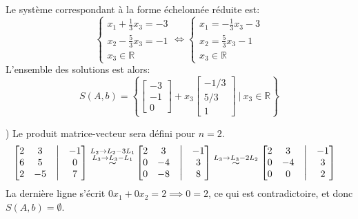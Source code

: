 \documentclass{article}
\newcommand{\R}{\mathbb{R}}
\begin{document}
Le système correspondant à la forme échelonnée réduite est:
$$\begin{cases}
x_1 + \frac{1}{3} x_3 = -3 \\
x_2 - \frac{5}{3}x_3 = -1 \\
x_3 \in \R
\end{cases} \iff 
\begin{cases}
x_1 = -\frac{1}{3} x_3 -3 \\
x_2 = \frac{5}{3}x_3 -1 \\
x_3 \in \R
\end{cases}$$
L'ensemble des solutions est alors:
$$S(A,b) = \left\{ \begin{bmatrix} -3 \\ -1 \\ 0 \end{bmatrix} + x_3 \begin{bmatrix} -1/3 \\ 5/3 \\ 1 \end{bmatrix} \ | \ x_3 \in \R \right\}$$

) Le produit matrice-vecteur sera défini pour $n = 2$. \begin{align*}
    \begin{bmatrix}
    2 & 3 & \bigm| & -1 \\
    6 & 5 & \bigm| & 0 \\
    2 & -5 & \bigm| & 7
    \end{bmatrix}
    \overset{\substack{L_2 \rightarrow L_2-3L_1 \\L_3 \rightarrow L_3-L_1}}{\sim}
    &\begin{bmatrix}
    2 & 3 & \bigm| & -1 \\
    0 & -4 & \bigm| & 3 \\
    0 & -8 & \bigm| & 8
    \end{bmatrix}
    \overset{L_3 \rightarrow L_3 -2L_2}{\sim}
    \begin{bmatrix}
    2 & 3 & \bigm| & -1 \\
    0 & -4 & \bigm| & 3 \\
    0 & 0 & \bigm| & 2
    \end{bmatrix}
\end{align*}
La dernière ligne s'écrit $0 x_1 + 0 x_2 = 2 \implies 0=2$, ce qui est contradictoire, et donc $S(A,b) = \emptyset$. \\
\end{document}
